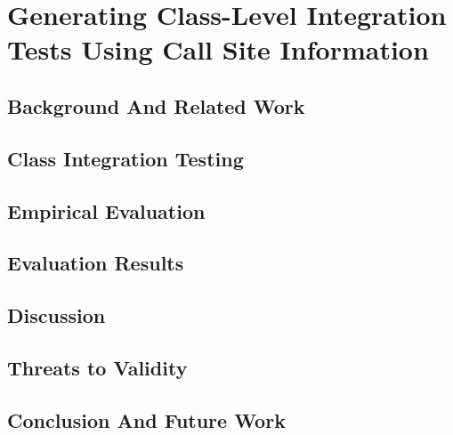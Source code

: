 \chapter{Generating Class-Level Integration Tests Using Call Site Information}
\label{sec:cling:introduction}



\section{Background And Related Work}
\label{sec:cling:background}



\section{Class Integration Testing}
\label{sec:cling:approach}



\section{Empirical Evaluation}
\label{sec:cling:evaluation}


\section{Evaluation Results}
\label{sec:cling:results}



\section{Discussion}
\label{sec:cling:discussion}



\section{Threats to Validity}
\label{sec:cling:threats}



\section{Conclusion And Future Work}
\label{sec:cling:future-conclusion}
